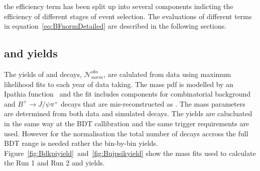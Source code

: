 the efficiency term has been split up into several components indicting the efficiency of different stages of event selection.  The evaluations of different terms in equation~\ref{eq:BFnormDetailed} are described in the following sections.


\subsection{\bdkpi and \bujpsik yields}
The yields of \bujpsik and \bdkpi decays, $\mathcal{N}^{obs}_{norm}$, are calulated from data using maximum likelihood fits to each year of data taking. 
The \bujpsik mass pdf is modelled by an Ipathia function~\cite{} and the fit includes components for combinatorial background and $B^{+} \to J/\psi \pi^{+}$ decays that are mis-reconstructed as \bujpsik. The mass \pdf parameters are determined from both data and simulated decays. The \bdkpi yields are calucluated in the same way at the BDT callibration and the same trigger requirements are used. However for the normalisation the total number of \bdkpi decays accross the full BDT range is needed rather the bin-by-bin yields. Figure~\ref{fig:Bdkpiyield}~and~\ref{fig:Bujpsikyield} show the mass fits used to calculate the Run 1 and Run 2 \bdkpi and \bujpsik yields.


